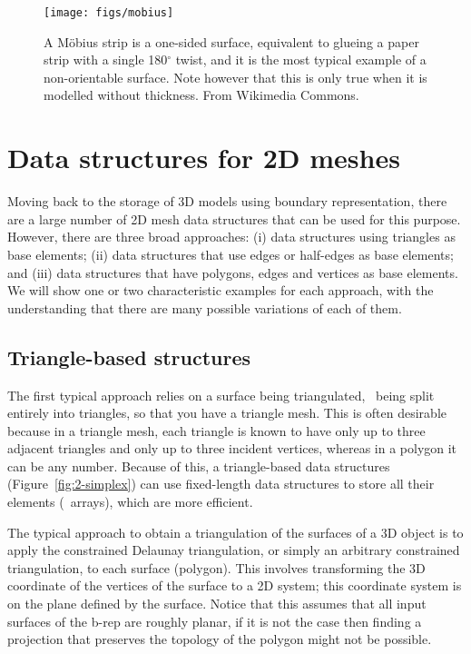 \begin{figure}
\centering
\texttt{[image: figs/mobius]}
\caption[A M\"obius strip]{A M\"obius strip is a one-sided surface, equivalent to glueing a paper strip with a single 180\(^\circ\) twist, and it is the most typical example of a non-orientable surface. Note however that this is only true when it is modelled without thickness. From Wikimedia Commons.}%
\label{fig:mobius}
\end{figure}

\section{Data structures for 2D meshes}

Moving back to the storage of 3D models using boundary representation, there are a large number of 2D mesh data structures that can be used for this purpose.
However, there are three broad approaches: (i) data structures using triangles as base elements; (ii) data structures that use edges or half-edges as base elements; and (iii) data structures that have polygons, edges and vertices as base elements.
We will show one or two characteristic examples for each approach, with the understanding that there are many possible variations of each of them.

\subsection{Triangle-based structures}

The first typical approach relies on a surface being triangulated, \ie\ being split entirely into triangles, so that you have a triangle mesh.
This is often desirable because in a triangle mesh, each triangle is known to have only up to three adjacent triangles and only up to three incident vertices, whereas in a polygon it can be any number.
Because of this, a triangle-based data structures (Figure~\ref{fig:2-simplex}) can use fixed-length data structures to store all their elements (\eg\ arrays), which are more efficient.

The typical approach to obtain a triangulation of the surfaces of a 3D object is to apply the constrained Delaunay triangulation, or simply an arbitrary constrained triangulation, to each surface (polygon).
This involves transforming the 3D coordinate of the vertices of the surface to a 2D system; this coordinate system is on the plane defined by the surface.
Notice that this assumes that all input surfaces of the b-rep are roughly planar, if it is not the case then finding a projection that preserves the topology of the polygon might not be possible.

